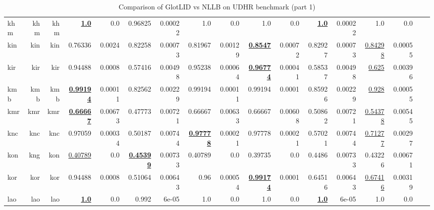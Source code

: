 \documentclass[11pt]{article}
\def\udhr{UDHR\xspace}
\def\nllb{NLLB\xspace}
\begin{document}
\begin{table*}[h]
{\begin{tabular}{lrrrrrrrrrrrrrrrr}
khm         & khm         & khm         & \textbf{\underline{1.0}}         & 0.0         & 0.96825         & 0.00022         & 1.0         & 0.0         & 1.0         & 0.0         & \textbf{\underline{1.0}}         & 0.00022         & 1.0         & 0.0         \\
kin         & kin         & kin         & 0.76336         & 0.0024         & 0.82258         & 0.00073         & 0.81967         & 0.00129         & \textbf{\underline{0.8547}}         & 0.00072         & 0.82927         & 0.00073         & \underline{0.84298}         & 0.00055         \\
kir         & kir         & kir         & 0.94488         & 0.0008         & 0.57416         & 0.00498         & 0.95238         & 0.00064         & \textbf{\underline{0.96774}}         & 0.00041         & 0.58537         & 0.00498         & \underline{0.625}         & 0.00396         \\
kmb         & kmb         & kmb         & \textbf{\underline{0.99194}}         & 0.00011         & 0.82562         & 0.00229         & 0.99194         & 0.00011         & 0.99194         & 0.0001         & 0.85926         & 0.00229         & \underline{0.928}         & 0.00055         \\
kmr         & kmr         & kmr         & \textbf{\underline{0.66667}}         & 0.00673         & 0.47773         & 0.00721         & 0.66667         & 0.00633         & 0.66667         & 0.00608         & 0.50862         & 0.00721         & \underline{0.54378}         & 0.00545         \\
knc         & knc         & knc         & 0.97059         & 0.00034         & 0.50187         & 0.00744         & \textbf{\underline{0.97778}}         & 0.00021         & 0.97778         & 0.00021         & 0.57021         & 0.00744         & \underline{0.71277}         & 0.00297         \\
kon         & kng         & kon         & \underline{0.40789}         & 0.0         & \textbf{\underline{0.45399}}         & 0.00733         & 0.40789         & 0.0         & 0.39735         & 0.0         & 0.4486         & 0.00733         & 0.43226         & 0.00671         \\
kor         & kor         & kor         & 0.94488         & 0.0008         & 0.51064         & 0.00643         & 0.96         & 0.00054         & \textbf{\underline{0.99174}}         & 0.0001         & 0.64516         & 0.00643         & \underline{0.67416}         & 0.00319         \\
lao         & lao         & lao         & \textbf{\underline{1.0}}         & 0.0         & 0.992         & 6e-05         & 1.0         & 0.0         & 1.0         & 0.0         & \textbf{\underline{1.0}}         & 6e-05         & 1.0         & 0.0         \\
\end{tabular}
}
\caption{Comparison of GlotLID vs \nllb on \udhr benchmark (part 1)}
\label{tab:appendix_glotlid_nllb_udhr_1}
\end{table*}
\end{document}
